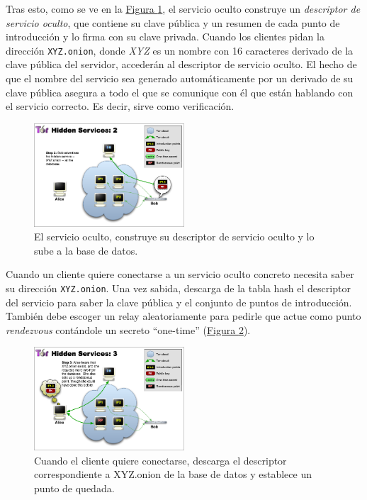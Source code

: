 \documentclass[10pt,a4paper,spanish]{article}
\begin{document}
Tras esto, como se ve en la \hyperref[ths2]{Figura \ref*{ths2}}, el servicio oculto construye un \textit{descriptor de servicio oculto}, que contiene su clave pública y un resumen de cada punto de introducción y lo firma con su clave privada. Cuando los clientes pidan la dirección \texttt{XYZ.onion}, donde \textit{XYZ} es un nombre con 16 caracteres derivado de la clave pública del servidor, accederán al descriptor de servicio oculto. El hecho de que el nombre del servicio sea generado automáticamente por un derivado de su clave pública asegura a todo el que se comunique con él que están hablando con el servicio correcto. Es decir, sirve como verificación.

\begin{figure}[!h]
    \centering
    \includegraphics[width=0.5\textwidth]{THS-2}
    \caption{El servicio oculto, construye su descriptor de servicio oculto y lo sube a la base de datos.}
    \label{ths2}
\end{figure}

Cuando un cliente quiere conectarse a un servicio oculto concreto necesita saber su dirección \texttt{XYZ.onion}. Una vez sabida, descarga de la tabla hash el descriptor del servicio para saber la clave pública y el conjunto de puntos de introducción. También debe escoger un relay aleatoriamente para pedirle que actue como punto \textit{rendezvous} contándole un secreto ``one-time'' (\hyperref[ths3]{Figura \ref*{ths3}}).

\begin{figure}[!h]
    \centering
    \includegraphics[width=0.5\textwidth]{THS-3}
    \caption{Cuando el cliente quiere conectarse, descarga el descriptor correspondiente a XYZ.onion de la base de datos y establece un punto de quedada.}
    \label{ths3}
\end{figure}
\end{document}
